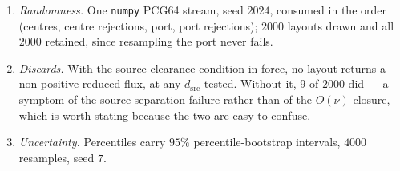 \documentclass[pdflatex,sn-mathphys-num]{sn-jnl}
\numberwithin{equation}{section}
\theoremstyle{thmstyleone}%
\theoremstyle{definition}
\theoremstyle{remark}
\begin{document}
\begin{enumerate}[label=(\roman*)]
substantial fraction of port proposals, the sensitivity to $d_{\mathrm{src}}$ is
reported in Table~\ref{tab:nullsweep}.
\item \emph{Randomness.} One \texttt{numpy} PCG64 stream, seed $2024$, consumed
in the order (centres, centre rejections, port, port rejections); $2000$ layouts
drawn and all $2000$ retained, since resampling the port never fails.
\item \emph{Discards.} With the source-clearance condition in force, no layout returns a non-positive reduced flux, at any $d_{\mathrm{src}}$ tested. Without it, $9$ of $2000$ did --- a symptom of the source-separation failure rather than of the $O(\nu)$ closure, which is worth stating because the two are
easy to confuse.
\item \emph{Uncertainty.} Percentiles carry $95\%$ percentile-bootstrap
intervals, $4000$ resamples, seed $7$.
\end{enumerate}
\end{document}
